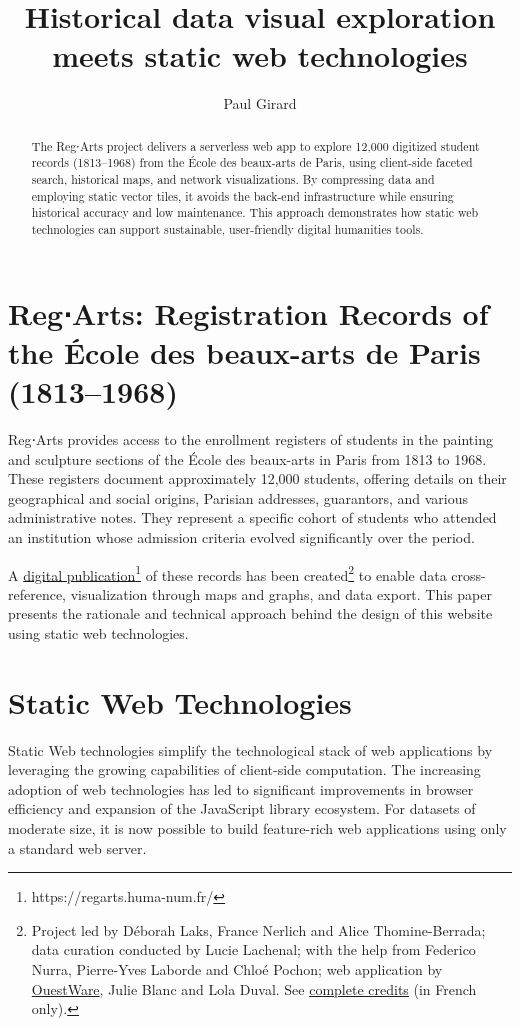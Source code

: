 \documentclass[final]{anthology-ch} %
\title{Historical data visual exploration meets static web technologies}
\author[1]{Paul Girard}[
  orcid=0000-0001-9332-3308
]
\affiliation{1}{OuestWare, Nantes, France}
\begin{document}
\maketitle
\begin{abstract}
The Reg⋅Arts project delivers a serverless web app to explore 12,000 digitized student records (1813–1968) from the École des beaux-arts de Paris, using client-side faceted search, historical maps, and network visualizations. By compressing data and employing static vector tiles, it avoids the back-end infrastructure while ensuring historical accuracy and low maintenance. This approach demonstrates how static web technologies can support sustainable, user-friendly digital humanities tools.
\end{abstract}

\section{Reg⋅Arts: Registration Records of the École des beaux-arts de Paris (1813--1968)}
Reg⋅Arts provides access to the enrollment registers of students in the painting and sculpture sections of the École des beaux-arts in Paris from 1813 to 1968. These registers document approximately 12,000 students, offering details on their geographical and social origins, Parisian addresses, guarantors, and various administrative notes. They represent a specific cohort of students who attended an institution whose admission criteria evolved significantly over the period.

A \href{https://regarts.huma-num.fr/}{digital publication}\footnote{https://regarts.huma-num.fr/} of these records has been created\footnote{Project led by Déborah Laks, France Nerlich and Alice Thomine-Berrada; data curation conducted by Lucie Lachenal; with the help from Federico Nurra, Pierre-Yves Laborde and Chloé Pochon; web application by \href{https://ouestware.com}{OuestWare}, Julie Blanc and Lola Duval. See \href{https://regarts.huma-num.fr/a-propos\#lequipe}{complete credits} (in French only).} to enable data cross-reference, visualization through maps and graphs, and data export. This paper presents the rationale and technical approach behind the design of this website using static web technologies.

\section{Static Web Technologies}
Static Web technologies simplify the technological stack of web applications by leveraging the growing capabilities of client-side computation. The increasing adoption of web technologies has led to significant improvements in browser efficiency and expansion of the JavaScript library ecosystem. For datasets of moderate size, it is now possible to build feature-rich web applications using only a standard web server.
\end{document}
